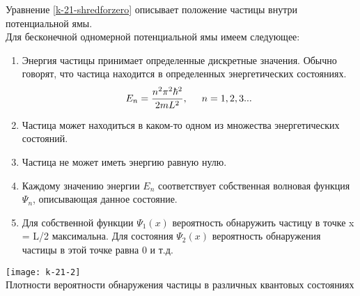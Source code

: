 \documentclass[__main__.tex]{subfiles}
\begin{document}
Уравнение \ref{k-21-shredforzero} описывает положение частицы внутри потенциальной ямы. \\
Для бесконечной одномерной потенциальной ямы имеем следующее:
\begin{enumerate}
	\item Энергия частицы принимает определенные дискретные значения. Обычно говорят, что частица находится в определенных энергетических состояниях.
	\begin{gather}
	E_n=\frac{n^2\mathcal{\pi}^2\hbar^2}{2mL^2}, \hspace{0.5cm} n=1,2,3...
	\end{gather}
	\item Частица может находиться в каком-то одном из множества энергетических состояний.
	\item Частица не может иметь энергию равную нулю.
	\item Каждому значению энергии $E_n$ соответствует собственная волновая функция $\Psi_n$, описывающая данное состояние.
	\item Для собственной функции $\Psi_1(x)$ вероятность обнаружить частицу в точке x = L/2 максимальна. Для состояния $\Psi_2(x)$ вероятность обнаружения частицы в этой точке равна 0 и т.д.
\end{enumerate}
\begin{center}
	\label{k-21-PDF}
	\texttt{[image: k-21-2]}\\
	Плотности вероятности обнаружения частицы в различных квантовых состояниях
\end{center}
\end{document}
